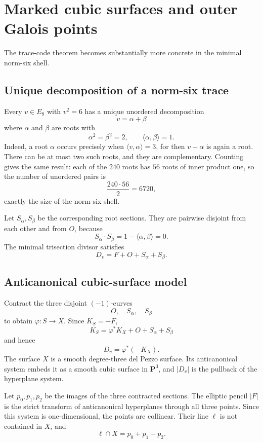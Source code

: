 \section{Marked cubic surfaces and outer Galois points}

The trace-code theorem becomes substantially more concrete in the minimal
norm-six shell.

\subsection{Unique decomposition of a norm-six trace}

Every $v\in E_8$ with $v^2=6$ has a unique unordered decomposition
\[
\boxed{v=\alpha+\beta}
\]
where $\alpha$ and $\beta$ are roots with
\[
\alpha^2=\beta^2=2,
\qquad
\langle\alpha,\beta\rangle=1.
\]
Indeed, a root $\alpha$ occurs precisely when $\langle v,\alpha\rangle=3$,
for then $v-\alpha$ is again a root.  There can be at most two such roots,
and they are complementary.  Counting gives the same result: each of the
$240$ roots has $56$ roots of inner product one, so the number of unordered
pairs is
\[
\frac{240\cdot56}{2}=6720,
\]
exactly the size of the norm-six shell.

Let $S_\alpha,S_\beta$ be the corresponding root sections.  They are pairwise
disjoint from each other and from $O$, because
\[
S_\alpha\cdot S_\beta
=1-\langle\alpha,\beta\rangle=0.
\]
The minimal trisection divisor satisfies
\[
\boxed{
D_v=F+O+S_\alpha+S_\beta.
}
\]

\subsection{Anticanonical cubic-surface model}

Contract the three disjoint $(-1)$-curves
\[
O,\quad S_\alpha,\quad S_\beta
\]
to obtain $\varphi:S\to X$.  Since $K_S=-F$,
\[
K_S=\varphi^*K_X+O+S_\alpha+S_\beta
\]
and hence
\[
\boxed{D_v=\varphi^*(-K_X).}
\]
The surface $X$ is a smooth degree-three del Pezzo surface.  Its
anticanonical system embeds it as a smooth cubic surface in $\mathbf P^3$, and
$|D_v|$ is the pullback of the hyperplane system.

Let $p_0,p_1,p_2$ be the images of the three contracted sections.  The
elliptic pencil $|F|$ is the strict transform of anticanonical hyperplanes
through all three points.  Since this system is one-dimensional, the points
are collinear.  Their line $\ell$ is not contained in $X$, and
\[
\ell\cap X=p_0+p_1+p_2.
\]

